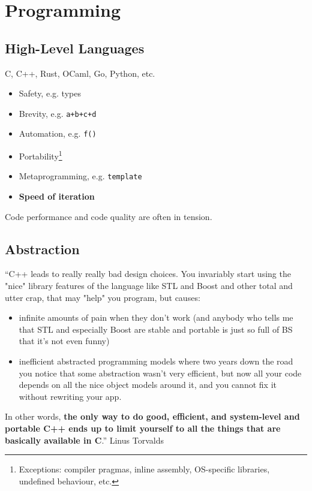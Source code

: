\documentclass{article}
\begin{document}
\section{Programming}

\subsection{High-Level Languages}
C, C++, Rust, OCaml, Go, Python, etc.
\begin{itemize}
	\item Safety, e.g. types %
	\item Brevity, e.g. \texttt{a+b+c+d}
	\item Automation, e.g. \texttt{f()}
	\item Portability\footnote{Exceptions: compiler pragmas, inline assembly, OS-specific libraries, undefined behaviour, etc.}
	\item Metaprogramming, e.g. \texttt{template}
	\item \textbf{Speed of iteration}
\end{itemize}

Code performance and code quality are often in tension.

\subsection{Abstraction}
\begin{block}{}
	``C++ leads to really really bad design choices. You invariably start using the "nice" library features of the language like STL and Boost and other total and utter crap, that may "help" you program, but causes:
	\begin{itemize}
	\item infinite amounts of pain when they don't work (and anybody who tells me that STL and especially Boost are stable and portable is just so full of BS that it's not even funny)
	\item inefficient abstracted programming models where two years down the road you notice that some abstraction wasn't very efficient, but now all your code depends on all the nice object models around it, and you cannot fix it without rewriting your app.
	\end{itemize}
	In other words, \textbf{the only way to do good, efficient, and system-level and portable C++ ends up to limit yourself to all the things that are basically available in C}.'' Linus Torvalds
\end{block}
\end{document}
